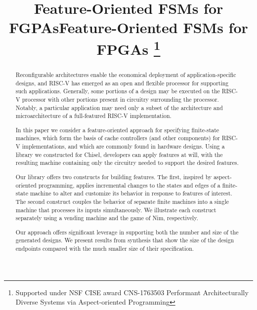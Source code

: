 \documentclass[conference]{IEEEtran}
\begin{document}
\title{Feature-Oriented FSMs for FGPAs}

\title{Feature-Oriented FSMs for FPGAs
\thanks{Supported under NSF CISE award CNS-1763503 Performant Architecturally Diverse Systems via Aspect-oriented Programming}
}

\author{

}
\long{}

\maketitle

\begin{abstract}
Reconfigurable architectures enable the economical deployment of application-specific designs, and RISC-V has emerged as an open and flexible processor for supporting such applications.  Generally, some portions of a design may be executed on the RISC-V processor with other portions present in circuitry surrounding the processor.  Notably, a particular application may need only a subset of the architecture and microarchitecture of a full-featured RISC-V implementation.

In this paper we consider a feature-oriented approach for specifying finite-state machines, which form the basis of cache controllers (and other components) for RISC-V implementations, and which are commonly found in hardware designs. Using a library we constructed for Chisel, developers can apply features at will, with the resulting machine containing only the circuitry needed to support the desired features.  

Our library offers two constructs for building features. The first, inspired by aspect-oriented programming, applies incremental changes to the states and edges of a finite-state machine to alter and customize its behavior in response to features of interest.  The second construct couples the behavior of separate finite machines into a single machine that processes its inputs simultaneously.  We illustrate each construct separately using a vending machine and the game of Nim, respectively.

Our approach offers significant leverage in supporting both the number and size of the generated designs.  We present results from synthesis that show the size of the design endpoints compared with the much smaller size of their specification.
\end{abstract}
\end{document}
